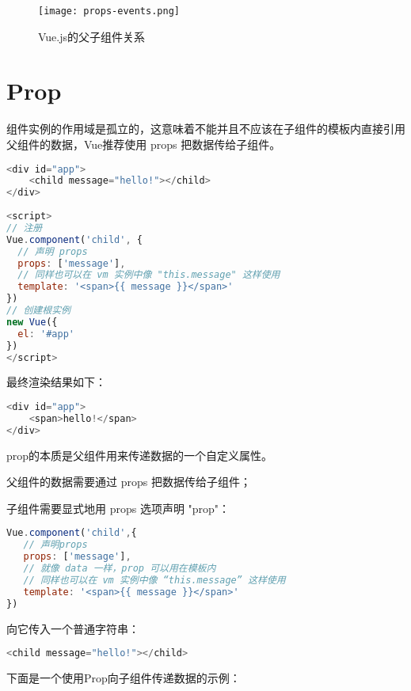 \begin{figure}[htbp]
\centering
\texttt{[image: props-events.png]}
\caption{Vue.js的父子组件关系}
\end{figure}



\section{Prop}



组件实例的作用域是孤立的，这意味着不能并且不应该在子组件的模板内直接引用父组件的数据，Vue推荐使用 props 把数据传给子组件。


\begin{lstlisting}[language=JavaScript]
<div id="app">
    <child message="hello!"></child>
</div>
 
<script>
// 注册
Vue.component('child', {
  // 声明 props
  props: ['message'],
  // 同样也可以在 vm 实例中像 "this.message" 这样使用
  template: '<span>{{ message }}</span>'
})
// 创建根实例
new Vue({
  el: '#app'
})
</script>
\end{lstlisting}

最终渲染结果如下：


\begin{lstlisting}[language=JavaScript]
<div id="app">
    <span>hello!</span>
</div>
\end{lstlisting}

prop的本质是父组件用来传递数据的一个自定义属性。

\begin{compactitem}
\item 父组件的数据需要通过 props 把数据传给子组件；
\item 子组件需要显式地用 props 选项声明 "prop"：
\end{compactitem}


\begin{lstlisting}[language=JavaScript]
Vue.component('child',{
   // 声明props
   props: ['message'],
   // 就像 data 一样，prop 可以用在模板内
   // 同样也可以在 vm 实例中像 “this.message” 这样使用
   template: '<span>{{ message }}</span>'
})
\end{lstlisting}

向它传入一个普通字符串：

\begin{lstlisting}[language=JavaScript]
<child message="hello!"></child>
\end{lstlisting}

下面是一个使用Prop向子组件传递数据的示例：


